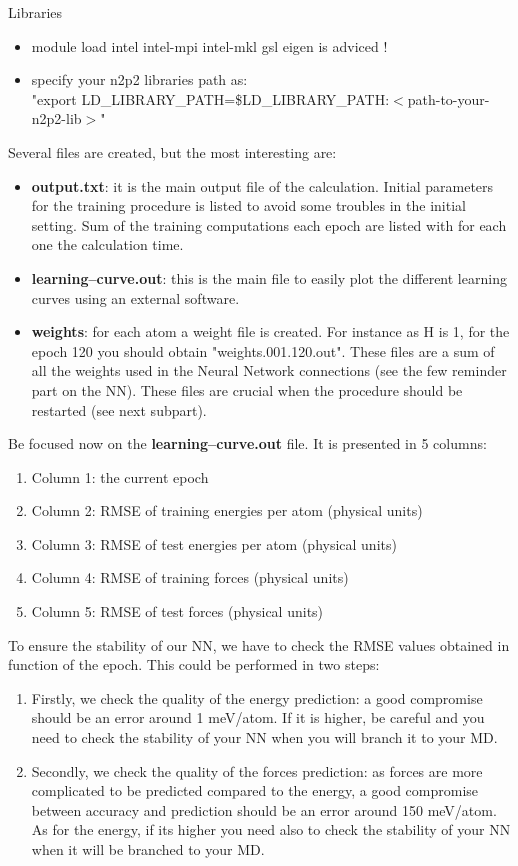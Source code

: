 \documentclass[12pt]{article}
\begin{document}
\begin{mybox4}{Libraries}
\begin{itemize}
    \item module load intel intel-mpi intel-mkl gsl eigen is adviced !
    \item specify your n2p2 libraries path as: \\ "export LD\_LIBRARY\_PATH=\$LD\_LIBRARY\_PATH:$<$path-to-your-n2p2-lib$>$"
\end{itemize}
\end{mybox4}
Several files are created, but the most interesting are:
\begin{itemize}
    \item \textbf{output.txt}: it is the main output file of the calculation. Initial parameters for the training procedure is listed to avoid some troubles in the initial setting. Sum of the training computations each epoch are listed with for each one the calculation time. 
    \item \textbf{learning--curve.out}: this is the main file to easily plot the different learning curves using an external software.
    \item \textbf{weights}: for each atom a weight file is created. For instance as H is 1, for the epoch 120 you should obtain "weights.001.120.out". These files are a sum of all the weights used in the Neural Network connections (see the few reminder part on the NN). These files are crucial when the procedure should be restarted (see next subpart). 
\end{itemize}
Be focused now on the \textbf{learning--curve.out} file. It is presented in 5 columns:
\begin{enumerate}
    \item Column 1: the current epoch
    \item Column 2: RMSE of training energies per atom (physical units)
    \item Column 3: RMSE of test energies per atom (physical units)
    \item Column 4: RMSE of training forces (physical units)
    \item Column 5: RMSE of test forces (physical units)
\end{enumerate}
To ensure the stability of our NN, we have to check the RMSE values obtained in function of the epoch. This could be performed in two steps:
\begin{enumerate}
    \item Firstly, we check the quality of the energy prediction: a good compromise should be an error around 1 meV/atom. If it is higher, be careful and you need to check the stability of your NN when you will branch it to your MD.
    \item Secondly, we check the quality of the forces prediction: as forces are more complicated to be predicted compared to the energy, a good compromise between accuracy and prediction should be an error around 150 meV/atom. As for the energy, if its higher you need also to check the stability of your NN when it will be branched to your MD. 
\end{enumerate}
\end{document}

